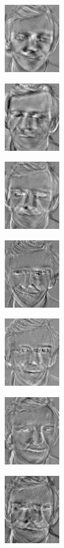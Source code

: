 \documentclass[a4paper]{article}
\begin{document}
\includegraphics[scale=0.500000]{PrincipalComponent3.jpg}

\includegraphics[scale=0.500000]{PrincipalComponent4.jpg}

\includegraphics[scale=0.500000]{PrincipalComponent5.jpg}

\includegraphics[scale=0.500000]{PrincipalComponent6.jpg}

\includegraphics[scale=0.500000]{PrincipalComponent7.jpg}

\includegraphics[scale=0.500000]{PrincipalComponent8.jpg}

\includegraphics[scale=0.500000]{PrincipalComponent9.jpg}
\end{document}
